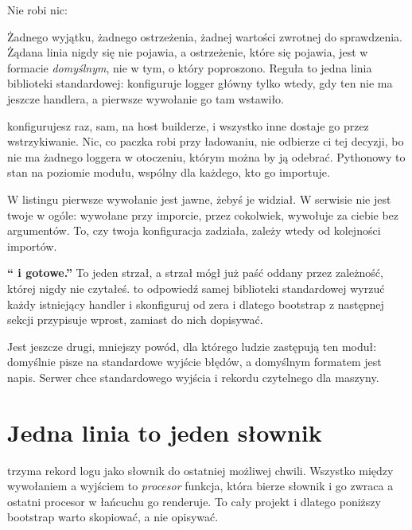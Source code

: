 \noindent
Nie robi nic:


\noindent
Żadnego wyjątku, żadnego ostrzeżenia, żadnej wartości zwrotnej do
sprawdzenia. Żądana linia  nigdy się nie pojawia, a ostrzeżenie,
które się pojawia, jest w formacie \emph{domyślnym}, nie w tym, o który
poproszono. Reguła to jedna linia biblioteki standardowej: 
konfiguruje logger główny tylko wtedy, gdy ten nie ma jeszcze handlera, a
pierwsze wywołanie go tam wstawiło.

\begin{csbox}
 konfigurujesz raz, sam, na host builderze, i wszystko inne
dostaje go przez wstrzykiwanie. Nic, co paczka robi przy ładowaniu, nie
odbierze ci tej decyzji, bo nie ma żadnego loggera w otoczeniu, którym można
by ją odebrać. Pythonowy  to stan na poziomie modułu, wspólny
dla każdego, kto go importuje.
\end{csbox}

\noindent
W listingu pierwsze wywołanie jest jawne, żebyś je widział. W serwisie nie
jest twoje w ogóle:  wywołane przy imporcie, przez
cokolwiek, wywołuje za ciebie  bez argumentów. To, czy
twoja konfiguracja zadziała, zależy wtedy od kolejności importów.

\begin{trapbox}
\textbf{\enquote{ i gotowe.}} To jeden strzał, a
strzał mógł już paść \dash{} oddany przez zależność, której nigdy nie
czytałeś.  to odpowiedź samej biblioteki standardowej
\dash{} wyrzuć każdy istniejący handler i skonfiguruj od zera \dash{} i
dlatego bootstrap z następnej sekcji przypisuje  wprost,
zamiast do nich dopisywać.
\end{trapbox}

\noindent
Jest jeszcze drugi, mniejszy powód, dla którego ludzie zastępują ten moduł:
domyślnie pisze na standardowe wyjście błędów, a domyślnym formatem jest
napis. Serwer chce standardowego wyjścia i rekordu czytelnego dla maszyny.

\section{Jedna linia to jeden słownik}
\label{sec:ch12-structlog}

 trzyma rekord logu jako słownik do ostatniej możliwej
chwili. Wszystko między wywołaniem a wyjściem to \emph{procesor} \dash{}
funkcja, która bierze słownik i go zwraca \dash{} a ostatni procesor w
łańcuchu go renderuje. To cały projekt i dlatego poniższy bootstrap warto
skopiować, a nie opisywać.

